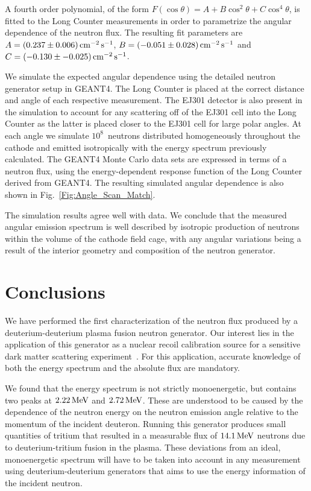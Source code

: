 A fourth order polynomial, of the form $F(\cos\theta)=A+B\cos^{2}\theta+C\cos^{4}\theta$, is fitted to the Long Counter measurements in order to parametrize the angular dependence of the neutron flux. The resulting fit parameters are $A=(0.237\pm0.006)\,\mathrm{cm^{-2}\,s^{-1}}$, $B=(-0.051\pm0.028)\,\mathrm{cm^{-2}\,s^{-1}}$ and $C=(-0.130\pm-0.025)\,\mathrm{cm^{-2}\,s^{-1}}$.

We simulate the expected angular dependence using the detailed neutron generator setup in GEANT4. The Long Counter is placed at the correct distance and angle of each respective measurement. The EJ301 detector is also present in the simulation to account for any scattering off of the EJ301 cell into the Long Counter as the latter is placed closer to the EJ301 cell for large polar angles. At each angle we simulate $10^8$~neutrons distributed homogeneously throughout the cathode and emitted isotropically with the energy spectrum previously calculated. The GEANT4 Monte Carlo data sets are expressed in terms of a neutron flux, using the energy-dependent response function of the Long Counter derived from GEANT4. The resulting simulated angular dependence is also shown in Fig.~\ref{Fig:Angle_Scan_Match}.

The simulation results agree well with data. We conclude that the measured angular emission spectrum is well described by isotropic production of neutrons within the volume of the cathode field cage, with any angular variations being a result of the interior geometry and composition of the neutron generator.

\section{Conclusions}

We have performed the first characterization of the neutron flux produced by a deuterium-deuterium plasma fusion neutron generator. Our interest lies in the application of this generator as a nuclear recoil calibration source for a sensitive dark matter scattering experiment~\cite{Aprile:2015uzo}. For this application, accurate knowledge of both the energy spectrum and the absolute flux are mandatory.

We found that the energy spectrum is not strictly monoenergetic, but contains two peaks at $2.22\,\mathrm{MeV}$ and $2.72\,\mathrm{MeV}$. These are understood to be caused by the dependence of the neutron energy on the neutron emission angle relative to the momentum of the incident deuteron. Running this generator produces small quantities of tritium that resulted in a measurable flux of $14.1\,\mathrm{MeV}$ neutrons due to deuterium-tritium fusion in the plasma. These deviations from an ideal, monoenergetic spectrum will have to be taken into account in any measurement using deuterium-deuterium generators that aims to use the energy information of the incident neutron.

